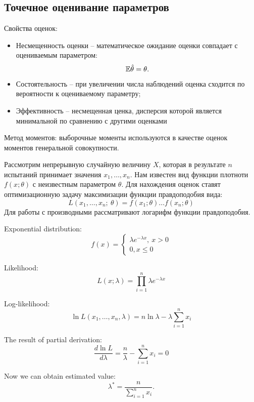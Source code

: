 \subsection*{Точечное оценивание параметров}

\begin{note}{}{}
    Свойства оценок:
    \begin{itemize}
        \item Несмещенность оценки -- математическое ожидание оценки совпадает с оцениваемым параметром:
        \[
            \mathbb{E}\hat{\theta} = \theta.  
        \]
        \item Состоятельность --  при увеличении числа наблюдений оценка сходится по вероятности к оцениваемому параметру;
        \item Эффективность -- несмещенная ценка, дисперсия которой является минимальной по сравнению с другими оценками
    \end{itemize}
\end{note}

\par
Метод моментов: выборочные моменты используются в качестве оценок моментов генеральной совокупности.

\par 
Рассмотрим непрерывную случайную величину $X$, которая в результате $n$ испытаний принимает значения $x_1, \ldots, x_n$. Нам известен вид функции плотноти $f(x; \theta)$ с неизвестным параметром $\theta$. Для нахождения оценок ставят оптимизационную задачу максимизации функции правдоподобия вида:
\[
    L\left(x_1, \ldots, x_n; \ \theta\right) = f\left(x_1;  \theta\right)\ldots f\left(x_n; \theta\right) 
\]
Для работы с производными рассматривают логарифм функции правдоподобия.

\Ex Exponential distribution:
\[
    f(x) = \left\{
        \begin{array}{c}
        \displaystyle\lambda e^{-\lambda x}, \ x > 0\\
        \displaystyle 0, x \leq 0
    \end{array}
    \right.  
\]
\par
Likelihood:
\[
    L(x; \lambda) = \prod\limits_{i=1}^n \lambda e^{-\lambda x}   
\]
\par
Log-likelihood:
\[
    \ln L\left(x_1, \ldots, x_n, \lambda\right) = n\ln \lambda - \lambda \sum\limits_{i=1}^n x_i  
\]
\par
The result of partial derivation:
\[
    \dfrac{d \ln L}{d\lambda} = \dfrac{n}{\lambda} - \sum \limits_{i=1}^n x_i = 0  
\]
\par
Now we can obtain estimated value:
\[
    \lambda^* = \dfrac{n}{\sum\limits_{i=1}^n x_i}.
\]
